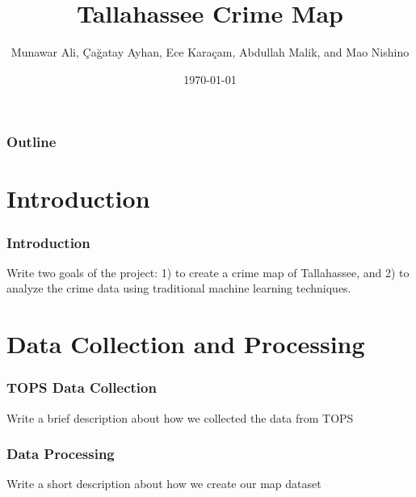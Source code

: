 \documentclass{beamer}
\title{Tallahassee Crime Map}
\author{Munawar Ali, Çağatay Ayhan, Ece Karaçam, Abdullah Malik, and Mao Nishino}
\date{\today}
\begin{document}
\begin{frame}
    \titlepage
\end{frame}

\begin{frame}
    \frametitle{Outline}
    \tableofcontents
\end{frame}


\section{Introduction}
\begin{frame}
    \frametitle{Introduction}
    Write two goals of the project: 1) to create a crime map of Tallahassee, and 2) to analyze the crime data using traditional machine learning techniques.
\end{frame}

\section{Data Collection and Processing}
\begin{frame}
    \frametitle{TOPS Data Collection}
    Write a brief description about how we collected the data from TOPS
\end{frame}

\begin{frame}
    \frametitle{Data Processing}
    Write a short description about how we create our map dataset
\end{frame}

\end{document}
